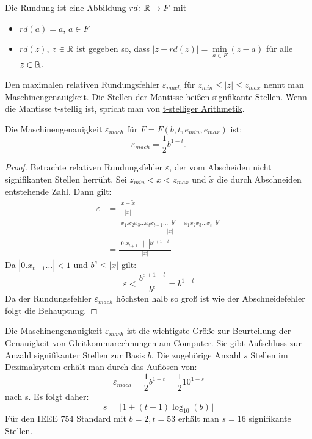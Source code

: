 \begin{definition}
Die Rundung ist eine Abbildung $rd\colon \mathbb{R} \to F $ mit 
\begin{itemize}
	\item $rd(a)=a$, $a \in F$
	\item $rd(z)$, $z \in  \mathbb{R}$ ist gegeben so, dass $|z-rd(z)|=\underset{a \in F}{\min}(z-a)$ für alle $z \in  \mathbb{R}$.
\end{itemize}
\end{definition}
\begin{definition}[Maschinengenauigkeit]
Den maximalen relativen Rundungsfehler $\varepsilon_{mach}$ für $z_{min} \le |z| \le z_{max}$ nennt man Maschinengenauigkeit.
Die Stellen der Mantisse heißen \underline{signfikante Stellen}.
Wenn die Mantisse t-stellig ist, spricht man von \underline{t-stelliger Arithmetik}.
\end{definition}
\begin{theorem}\label{thm:emach}
	Die Maschinengenauigkeit $\varepsilon_{mach}$ für $F=F(b,t,e_{min},e_{max})$ ist:
	\[
	\varepsilon_{mach} = \frac{1}{2} b^{1-t} \text{.}
	\]
\end{theorem}
\begin{proof}
Betrachte relativen Rundungsfehler $\varepsilon$, der vom Abscheiden nicht signifikanten Stellen herrüht. Sei $z_{min} < x < z_{max}$ und $\tilde{x}$ die durch Abschneiden entstehende Zahl.
Dann gilt:
\begin{align*}
	\varepsilon
	&= \frac{|x-\tilde{x}|}{|x|} \\
	&= \frac{|x_1.x_2x_3 \ldots x_t x_{t+1}\ldots \cdot b^{e}-x_1x_2x_3\ldots x_t \cdot b^{e}}{|x|} \\
	&=\frac{|0.x_{t+1}\ldots| \cdot |b^{e+1-t}|}{|x|}
\end{align*}
Da $|0.x_{t+1}\ldots|<1$ und $b^{e}\le |x|$ gilt:
\[
\varepsilon <\frac{b^{e+1-t}}{b^{e}}=b^{1-t}
\]
Da der Rundungsfehler $\varepsilon_{mach}$ höchsten halb so groß ist wie der Abschneidefehler folgt die Behauptung.
\end{proof}
Die Maschinengenauigkeit $\varepsilon_{mach}$ ist die wichtigste Größe zur Beurteilung der Genauigkeit von Gleitkommarechnungen am Computer. Sie gibt Aufschluss zur Anzahl signifikanter Stellen zur Basis $b$.
Die zugehörige Anzahl $s$ Stellen im Dezimalsystem erhält man durch das Auflösen von:
\[
\varepsilon_{mach} = \frac{1}{2}b^{1-t}=\frac{1}{2}10^{1-s}
\]
nach s. Es folgt daher:
\[
s= \lfloor 1+(t-1)\log_{10}(b) \rfloor
\]
Für den IEEE 754 Standard mit $b=2, t=53$ erhält man $s=16$ signifikante Stellen.
